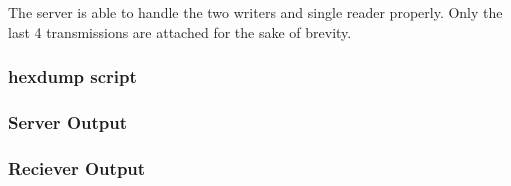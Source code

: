 \documentclass[12pt]{article}
\begin{document}
The server is able to handle the two writers and single reader properly.
Only the last 4 transmissions are attached for the sake of brevity.
\subsubsection{hexdump script}


\subsubsection{Server Output}


\subsubsection{Reciever Output}

\end{document}
